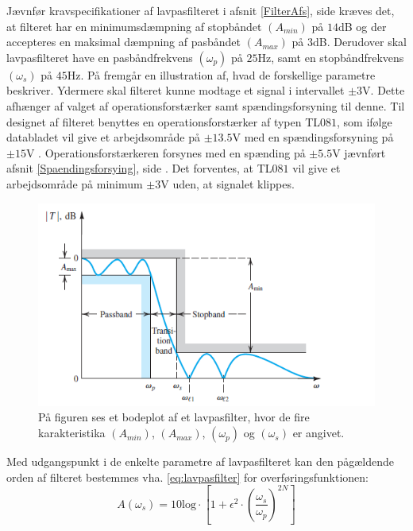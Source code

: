 Jævnfør kravspecifikationer af lavpasfilteret i afsnit \ref{FilterAfs}, side \pageref{FilterAfs} kræves det, at filteret har en minimumsdæmpning af stopbåndet $(A_{min})$ på $14$dB og der accepteres en maksimal dæmpning af pasbåndet $(A_{max})$ på $3$dB. Derudover skal lavpasfilteret have en pasbåndfrekvens $(\omega_p)$ på $25$Hz, samt en stopbåndfrekvens $(\omega_s)$ på $45$Hz. På  fremgår en illustration af, hvad de forskellige parametre beskriver. Ydermere skal filteret kunne modtage et signal i intervallet $\pm3$V. Dette afhænger af valget af operationsforstærker samt spændingsforsyning til denne. 
Til designet af filteret benyttes en operationsforstærker af typen TL$081$, som ifølge databladet vil give et arbejdsområde på $\pm13.5$V med en spændingsforsyning på $\pm15$V \cite{Corporation1995}. Operationsforstærkeren forsynes med en spænding på $\pm5.5$V jævnført afsnit \ref{Spaendingsforsying}, side \pageref{Spaendingsforsying}. Det forventes, at TL$081$ vil give et arbejdsområde på minimum $\pm3$V uden, at signalet klippes. %

\begin{figure}[H]
	\centering
	\includegraphics[scale=1.2]{figures/cProblemloesning/Lavpasfilter_generisk.PNG}
	\caption{På figuren ses et bodeplot af et lavpasfilter, hvor de fire karakteristika $(A_{min})$, $(A_{max})$, $(\omega_p)$ og $(\omega_s)$ er angivet. \cite{Carter2013}}
	\label{fig:Lavpasfilter_generisk}
\end{figure}
\noindent Med udgangspunkt i de enkelte parametre af lavpasfilteret kan den pågældende orden af filteret bestemmes vha. \eqref{eq:lavpasfilter} for overføringsfunktionen:
\begin{equation} \label{eq:lavpasfilter}
A(\omega_s) = 10 \text{log} \cdot \left[1 + \epsilon^2 \cdot (\frac{\omega _s}{\omega _p})^{2N}\right] 
\end{equation}


